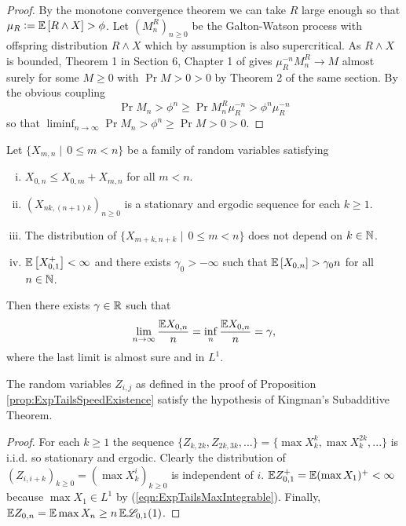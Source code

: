 \begin{proof}
By the monotone convergence theorem we can take $R$ large enough so that $\mu_R \vcentcolon= \mathbb{E}\left[ R \land X \right] > \phi$. Let $(M^R_n)_{n \geq 0}$ be the Galton-Watson process with offspring distribution $R \land X$ which by assumption is also supercritical. As $R \land X$ is bounded, Theorem 1 in Section 6, Chapter 1 of \cite{athreya2004branching} gives $\mu_R^{-n} M^R_n \to M$ almost surely for some $M \geq 0$ with $\Pr{M > 0} > 0$ by Theorem 2 of the same section. By the obvious coupling 
\begin{equation}
\Pr{M_n > \phi^n} \geq \Pr{M^R_n \mu_R^{-n} > \phi^n \mu_R^{-n}}
\end{equation} 
so that $\liminf_{n \to \infty} \Pr{M_n > \phi^n} \geq \Pr{M > 0} > 0$. 
\end{proof}

\begin{theorem}
Let $\{X_{m,n} \mid\, 0 \leq m < n\}$ be a family of random variables satisfying 
\begin{enumerate}[(i)]
\item $X_{0,n} \leq X_{0,m} + X_{m, n}$ for all $m < n$. 
\item $(X_{nk, (n+1)k})_{n \geq 0}$ is a stationary and ergodic sequence for each $k \geq 1$. 
\item The distribution of $\{X_{m + k, n + k} \mid\, 0 \leq m < n\}$ does not depend on $k \in \mathbb{N}$. 
\item $\mathbb{E}\left[ X_{0,1}^+ \right] < \infty$ and there exists $\gamma_0 > -\infty$ such that $\mathbb{E}\left[ X_{0,n} \right] > \gamma_0 n$ for all $n \in \mathbb{N}$. 
\end{enumerate}
Then there exists $\gamma \in \mathbb{R}$ such that 
\begin{equation}
\lim\limits_{n \to \infty} \frac{\mathbb{E} X_{0, n}}{n} = \inf\limits_{n} \frac{\mathbb{E} X_{0,n}}{n} = \gamma, 
\end{equation}
where the last limit is almost sure and in $L^1$. 
\end{theorem}

\begin{lemma}\label{lem:ExpTailsKingmanHolds}
The random variables $Z_{i,j}$ as defined in the proof of Proposition \ref{prop:ExpTailsSpeedExistence} satisfy the hypothesis of Kingman's Subadditive Theorem. 
\end{lemma}

\begin{proof}
For each $k \geq 1$ the sequence $\{Z_{k, 2k}, Z_{2k, 3k}, ...\} = \{\max X^k_k, \max X^{2k}_k, ... \}$ is i.i.d. so stationary and ergodic. Clearly the distribution of $(Z_{i, i + k})_{k \geq 0} = (\max X^i_k)_{k \geq 0}$ is independent of $i$. $\mathbb{E} Z^+_{0,1} = \mathbb{E} (\max X_1)^+ < \infty$ because $\max X_1 \in L^1$ by (\ref{eqn:ExpTailsMaxIntegrable}). Finally, $\mathbb{E} Z_{0, n} = \mathbb{E} \max X_n \geq n\, \mathbb{E} \mathscr{L}_{0,1}(1)$. 
\end{proof}

